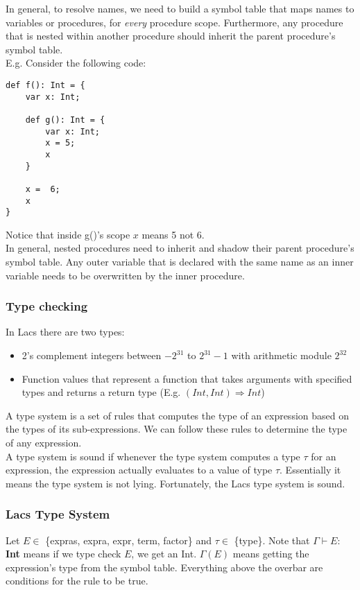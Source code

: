 \documentclass[12pt, letterpaper]{article}
\begin{document}
In general, to resolve names, we need to build a symbol table that maps names to variables or procedures, for \emph{every} procedure scope. Furthermore, any procedure that is nested within another procedure should inherit the parent procedure's symbol table.\\

E.g. Consider the following code:
\begin{lstlisting}
def f(): Int = {
	var x: Int;
	
	def g(): Int = {
		var x: Int;
		x = 5;
		x
	}
	
	x =  6;
	x
}
\end{lstlisting}
Notice that inside g()'s scope \(x\) means 5 not 6.\\

In general, nested procedures need to inherit and shadow their parent procedure's symbol table. Any outer variable that is declared with the same name as an inner variable needs to be overwritten by the inner procedure.

\subsubsection{Type checking}
In Lacs there are two types:
\begin{itemize}
\item 2's complement integers between \(-2^{31}\) to \(2^{31} - 1\) with arithmetic module \(2^{32}\)
\item Function values that represent a function that takes arguments with specified types and returns a return type (E.g. \((Int, Int) \Rightarrow Int\))
\end{itemize}

A type system is a set of rules that computes the type of an expression based on the types of its sub-expressions. We can follow these rules to determine the type of any expression.\\

A type system is sound if whenever the type system computes a type \(\tau\) for an expression, the expression actually evaluates to a value of type \(\tau\). Essentially it means the type system is not lying. Fortunately, the Lacs type system is sound.

\subsubsection{Lacs Type System}
Let \(E \in\) \{expras, expra, expr, term, factor\} and \(\tau \in\) \{type\}. Note that \(\Gamma \vdash E:\) \textbf{Int} means if we type check \(E\), we get an Int. \(\Gamma(E)\) means getting the expression's type from the symbol table. Everything above the overbar are conditions for the rule to be true.\\
\end{document}

